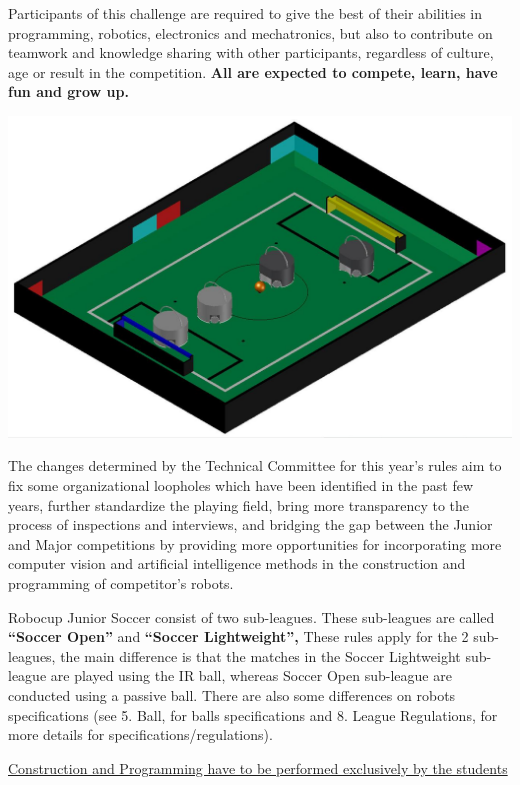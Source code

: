 \documentclass{article}
\begin{document}
Participants of this challenge are required to give the best of their abilities in programming, robotics, electronics and mechatronics, but also to contribute on teamwork and knowledge sharing with other participants, regardless of culture, age or result in the competition. \textbf{\textcolor{color-5}{All are expected to compete, learn, have fun and grow up.}} 

\includegraphics[width=1\textwidth]{media/image1.jpeg}

The changes determined by the Technical Committee for this year's rules aim \textcolor{color-5}{to fix some organizational loopholes which have been identified in the past few years, further standardize the playing field, bring more transparency to the process of inspections and interviews, and bridging the gap between the Junior and Major competitions by providing more opportunities for incorporating more computer vision and artificial intelligence methods in the construction and programming of competitor's robots.}

\textcolor{color-5}{Robocup Junior Soccer consist of two sub-leagues. These sub-leagues are called} \textbf{\textcolor{color-5}{``Soccer Open''}} \textcolor{color-5}{and} \textbf{\textcolor{color-5}{``Soccer Lightweight'',}} \textcolor{color-5}{These rules apply for the 2 sub-leagues, the main difference is that the matches in the Soccer Lightweight sub-league are played using the IR ball, whereas Soccer Open sub-league are conducted using a passive ball. There are also some differences on robots specifications (see 5. Ball, for balls specifications and 8. League Regulations, for more details for specifications/regulations).} 

\underline{Construction and Programming have to be performed exclusively by the students} 
\end{document}

